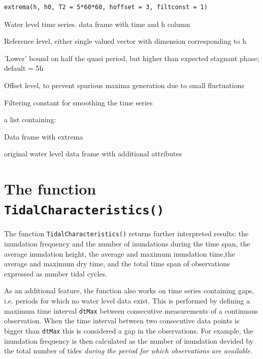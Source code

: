 \documentclass[10pt,a4wide]{article}
\begin{document}
\begin{Usage}
\begin{verbatim}extrema(h, h0, T2 = 5*60*60, hoffset = 3, filtconst = 1)\end{verbatim}
\end{Usage}
\begin{Arguments}
\begin{ldescription}
\item[\code{h }] Water level time series. data frame with time and h column
\item[\code{h0 }] Reference level, either single valued vector with dimension corresponding to h
\item[\code{T2 }] 'Lower' bound on half the quasi period, but higher than expected stagnant phase; default = 5h
\item[\code{hoffset}] Offset level, to prevent spurious maxima generation due to small fluctuations
\item[\code{filtconst }] Filtering constant for smoothing the time series
\end{ldescription}
\end{Arguments}
\begin{Value}
a list containing:
\begin{ldescription}
\item[\code{HL }] Data frame with extrema
\item[\code{h }] original water level data frame with additional attributes
\end{ldescription}
\end{Value}

\section{The function \texttt{TidalCharacteristics()}}
The function \texttt{TidalCharacteristics()} returns further interpreted results: the inundation frequency and the number of inundations during the time span, the average inundation height, the average and maximum inundation time,the average and maximum dry time, and the total time span of observations expressed as number tidal cycles.

As an additional feature, the function also works on time series containing gaps, i.e. periods for which no water level data exist. This is performed by defining a maximum time interval \texttt{dtMax} between consecutive measurements of a continuous observation. When the time interval between two consecutive data points is bigger than \texttt{dtMax} this is considered a gap in the observations. For example, the inundation frequency is then calculated as the number of inundation devided by the total number of tides \emph{during the period for which observations are available}.
\end{document}
